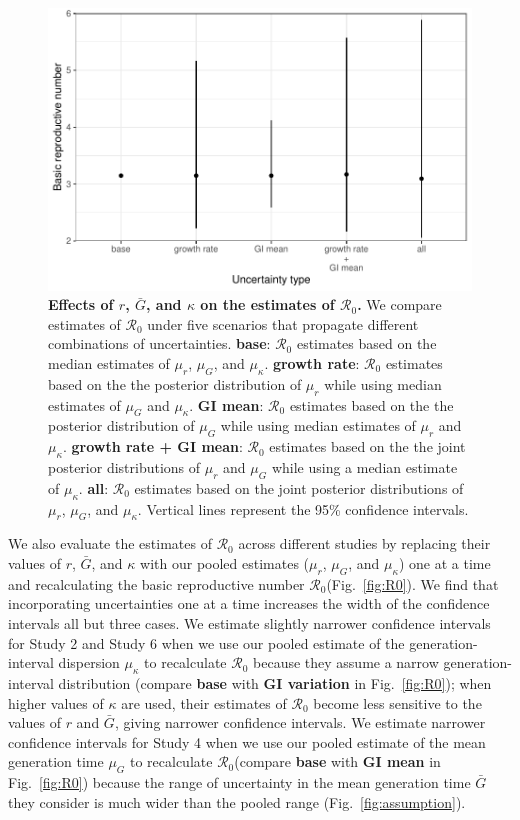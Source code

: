 \documentclass[12pt]{article}
\newcommand{\fref}[1]{Fig.~\ref{fig:#1}}
\newcommand{\Rx}[1]{\ensuremath{{\mathcal R}_{#1}}}
\newcommand{\Ro}{\Rx{0}\xspace}
\begin{document}
\begin{figure}[!ht]
\includegraphics[width=\textwidth]{figure2.pdf}
\caption{
\textbf{Effects of $r$, $\bar G$, and $\kappa$ on the estimates of \Ro.}
We compare estimates of \Ro under five scenarios that propagate different combinations of uncertainties.
\textbf{base}: \Ro estimates based on the median estimates of $\mu_r$, $\mu_G$, and $\mu_\kappa$.
\textbf{growth rate}: \Ro estimates based on the the posterior distribution of $\mu_r$ while using median estimates of $\mu_G$ and $\mu_\kappa$.
\textbf{GI mean}: \Ro estimates based on the the posterior distribution of $\mu_G$ while using median estimates of $\mu_r$ and $\mu_\kappa$.
\textbf{growth rate + GI mean}: \Ro estimates based on the the joint posterior distributions of $\mu_r$ and $\mu_G$ while using a median estimate of $\mu_\kappa$.
\textbf{all}: \Ro estimates based on the joint posterior distributions of  $\mu_r$, $\mu_G$, and $\mu_\kappa$.
Vertical lines represent the 95\% confidence intervals.
}
\label{fig:eff}
\end{figure}

We also evaluate the estimates of \Ro across different studies by 
replacing their values of $r$, $\bar G$, and $\kappa$ with our pooled estimates ($\mu_r$, $\mu_G$, and $\mu_\kappa$) one at a time and recalculating the basic reproductive number \Ro (\fref{R0}).
We find that incorporating uncertainties one at a time increases the width of the confidence intervals all but three cases.
We estimate slightly narrower confidence intervals for Study 2 and Study 6 when we use our pooled estimate of the generation-interval dispersion $\mu_\kappa$ to recalculate \Ro because they assume a narrow generation-interval distribution (compare \textbf{base} with \textbf{GI variation} in \fref{R0});
when higher values of $\kappa$ are used, their estimates of \Ro become less sensitive to the values of $r$ and $\bar G$, giving narrower confidence intervals.
We estimate narrower confidence intervals for Study 4 when we use our pooled estimate of the mean generation time $\mu_G$ to recalculate \Ro (compare \textbf{base} with \textbf{GI mean} in \fref{R0}) because the range of uncertainty in the mean generation time $\bar G$ they consider is much wider than the pooled range (\fref{assumption}).
\end{document}
